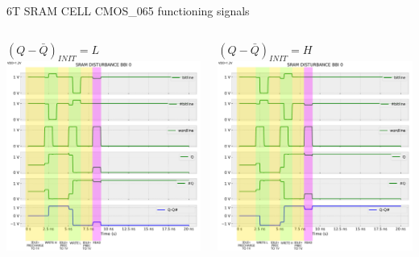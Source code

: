 \begin{frame}{6T SRAM CELL CMOS\_065 functioning signals}
	\begin{columns}
		\begin{column}{0.5\textwidth}
			$(Q-\bar{Q})_{INIT}=L$
			\includegraphics[width=\textwidth]{./figures/SRAMBBI0_zLOW.pdf}
		\end{column}
		\begin{column}{0.5\textwidth}
			$(Q-\bar{Q})_{INIT}=H$
			\includegraphics[width=\textwidth]{./figures/SRAMBBI0_zHIGH.pdf}
		\end{column}
	\end{columns}
\end{frame}
